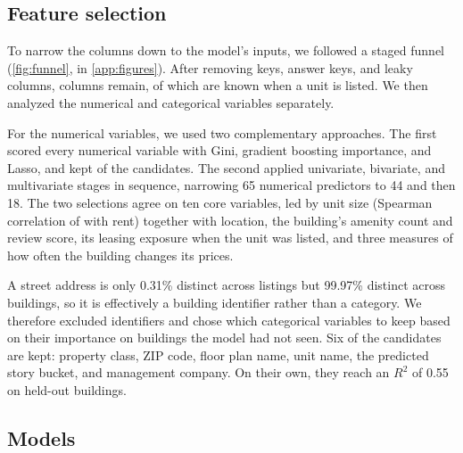 \subsection{Feature selection}\label{sec:selection}

To narrow the \nMasterCols{} columns down to the model's inputs, we followed a staged funnel
(\cref{fig:funnel}, in \cref{app:figures}). After removing keys, answer keys, and leaky columns, \nFeatureCols{} columns
remain, of which \nKnownCols{} are known when a unit is listed. We then analyzed the numerical and
categorical variables separately.

For the numerical variables, we used two complementary approaches. The first scored every numerical
variable with Gini, gradient boosting importance, and Lasso, and kept \nKeptNumeric{} of the
\nNumCandidates{} candidates. The second applied univariate, bivariate, and multivariate stages in
sequence, narrowing 65 numerical predictors to 44 and then 18. The two selections agree on ten core
variables, led by unit size (Spearman correlation of \sqftSpearman{} with rent) together with
location, the building's amenity count and review score, its leasing exposure when the unit was
listed, and three measures of how often the building changes its prices.

 A street address is only 0.31\% distinct across listings but 99.97\% distinct across
buildings, so it is effectively a building identifier rather than a category. We therefore excluded
identifiers and chose which categorical variables to keep based on their importance on buildings the
model had not seen. Six of the \nCatCandidates{} candidates are kept: property class, ZIP code, floor
plan name, unit name, the predicted story bucket, and management company. On their own, they reach
an \(R^2\) of 0.55 on held-out buildings.


\subsection{Models}\label{sec:models}

